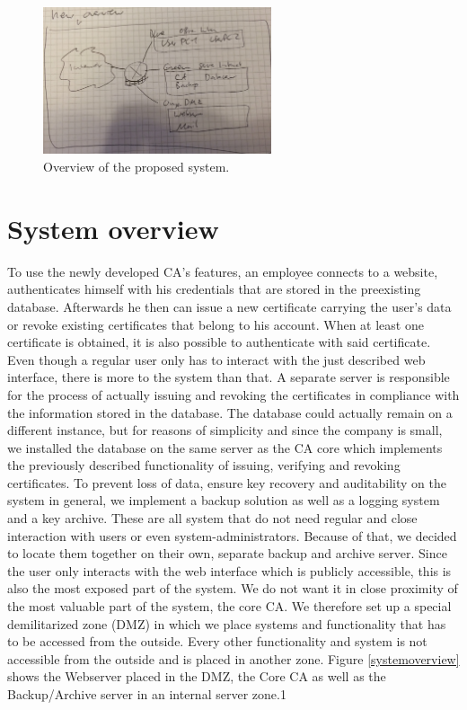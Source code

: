 \documentclass[a4paper, toc=index, 12pt, DIV14, twoside, BCOR2cm, headsepline, numbers=noenddot, bibliography=totoc]{scrbook}
\begin{document}
\begin{figure}[H]
  \centering
    \includegraphics[width=0.6\textwidth]{images/newoverview.jpg}  
  \caption{Overview of the proposed system.}
  \label{newoverview}
\end{figure}

\section{System overview}
To use the newly developed CA's features, an employee connects to a website, authenticates himself with his credentials that are stored in the preexisting database. Afterwards he then can issue a new certificate carrying the user's data or revoke existing certificates that belong to his account. When at least one certificate is obtained, it is also possible to authenticate with said certificate. Even though a regular user only has to interact with the just described web interface, there is more to the system than that. A separate server is responsible for the process of actually issuing and revoking the certificates in compliance with the information stored in the database. The database could actually remain on a different instance, but for reasons of simplicity and since the company is small, we installed the database on the same server as the CA core which implements the previously described functionality of issuing, verifying and revoking certificates. To prevent loss of data, ensure key recovery and auditability on the system in general, we implement a backup solution as well as a logging system and a key archive. These are all system that do not need regular and close interaction with users or even system-administrators. Because of that, we decided to locate them together on their own, separate backup and archive server.\newline
Since the user only interacts with the web interface which is publicly accessible, this is also the most exposed part of the system. We do not want it in close proximity of the most valuable part of the system, the core CA. We therefore set up a special demilitarized zone (DMZ) in which we place systems and functionality that has to be accessed from the outside. Every other functionality and system is not accessible from the outside and is placed in another zone.\newline
Figure \ref{systemoverview} shows the Webserver placed in the DMZ, the Core CA as well as the Backup/Archive server in an internal server zone.1
\end{document}
